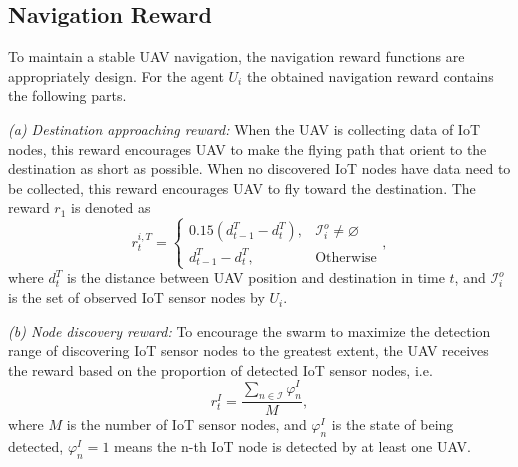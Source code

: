 \documentclass[journal]{IEEEtran}
\begin{document}
\subsection{Navigation Reward}\label{nav_rwd}
To maintain a stable UAV navigation, the navigation reward functions are appropriately design. For the agent $U_i$ the obtained navigation reward contains the following parts. 

\textit{(a) Destination approaching reward:} When the UAV is collecting data of IoT nodes, this reward encourages UAV to make the flying path that orient to the destination as short as possible. When no discovered IoT nodes have data need to be collected, this reward encourages UAV to fly toward the destination. The reward $r_1$ is denoted as
\begin{equation}\label{reward_1}
r^{i,T}_{t}=
\begin{cases}
            0.15\left({d_{t-1}^{T}-d_{t}^{T}}\right), & \mbox{$\mathcal{I}^{o}_{i}\neq\varnothing$}\\
            {d_{t-1}^{T}-d_{t}^{T}}, & \mbox{Otherwise}
\end{cases},
\end{equation}
where $d_{t}^{T}$ is the distance between UAV position and destination in time $t$, and $\mathcal{I}^{o}_{i}$ is the set of observed IoT sensor nodes by $U_i$.

\textit{(b) Node discovery reward:} To encourage the swarm to maximize the detection range of discovering IoT sensor nodes to the greatest extent, the UAV receives the reward based on the proportion of detected IoT sensor nodes, i.e. 
\begin{equation}\label{fairness_iot}
r^{I}_t=\frac{\sum_{n\in \mathcal{I}}{\varphi^{I}_{n}}}{M}, 
\end{equation}
where $M$ is the number of IoT sensor nodes, and $\varphi^{I}_{n}$ is the state of being detected, $\varphi^{I}_{n}=1$ means the n-th IoT node is detected by at least one UAV. 
\end{document}
